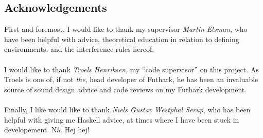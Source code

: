 \subsection{Acknowledgements}
\label{subsec:acknow}
First and foremost, I would like to thank my supervisor \textit{Martin Elsman}, who have
been helpful with advice, theoretical education in relation to defining
environments, and the interference rules hereof.
\\
\\
I would like to thank \textit{Troels Henriksen}, my ``code supervisor'' on this
project. As Troels is one of, if not \textit{the}, head developer of Futhark, he
has been an invaluable source of sound design advice and code reviews on my Futhark
development.
\\
\\
Finally, I like would like to thank \textit{Niels Gustav Westphal Serup}, who
has been helpful with giving me Haskell advice, at times where I have been stuck
in developement.
\vfill
Nå. Hej hej!
